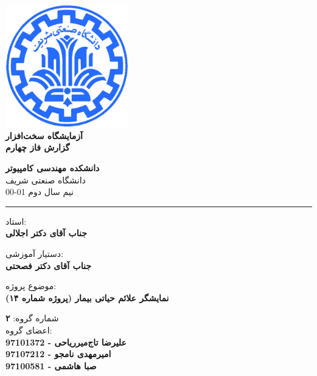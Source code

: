 \documentclass[12pt]{article}
\begin{document}
\begin{titlepage}
\begin{center}
        
\vspace*{0.7cm}

\includegraphics[width=0.4\textwidth]{sharif1.png}\\
\vspace{0.5cm}
\textbf{ \Huge{\emph ‌آزمایشگاه سخت‌افزار} }\\
\vspace{0.5cm}
\textbf{ \Large{گزارش فاز چهارم} }
\vspace{0.2cm}
       
 
      \large \textbf{دانشکده مهندسی کامپیوتر}\\\vspace{0.2cm}
    \large   دانشگاه صنعتی شریف\\\vspace{0.2cm}
       \large   ﻧﯿﻢ سال دوم 01-00 \\\vspace{0.2cm}
      \noindent\rule[1ex]{\linewidth}{1pt}
استاد:\\
    \textbf{{جناب آقای دکتر اجلالی}}


دستیار آموزشی:\\
\textbf{{جناب آقای دکتر فصحتی}}

    \vspace{0.25cm}
    
    موضوع پروژه:\\
    
    \textbf{{نمایشگر علائم حیاتی بیمار (پروژه شماره ۱۴)}}
    
    \vspace{0.35cm}
    
    
        شماره گروه:
    \textbf{{۲}}\\
    
اعضای گروه:\\

    \textbf{{علیرضا تاج‌میرریاحی - 97101372}}
    \\
   
     \textbf{{امیرمهدی نامجو - 97107212}}   
   \\
   
    \textbf{{ صبا هاشمی - 97100581}}
\end{center}
\end{titlepage}
\end{document}
